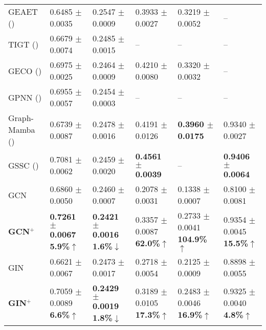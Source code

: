 \begin{table*}[t]
{\begin{tabular}{l|lllll}
        GEAET (\citeyear{liang2024graph}) & 0.6485{\tiny{ $\pm$ 0.0035}} & 0.2547{\tiny{ $\pm$ 0.0009}}&   0.3933{\tiny{ $\pm$ 0.0027}}& 0.3219{\tiny{ $\pm$ 0.0052}} & – \\
        TIGT (\citeyear{choi2024topology}) & 0.6679{\tiny{ $\pm$ 0.0074}} &0.2485{\tiny{ $\pm$ 0.0015}}&  – &  – &  – \\
        GECO (\citeyear{sancak2024scalable})& 0.6975{\tiny{ $\pm$ 0.0025}} &0.2464{\tiny{ $\pm$ 0.0009}} &0.4210{\tiny{ $\pm$ 0.0080}} &0.3320{\tiny{ $\pm$ 0.0032}}& – \\
        GPNN (\citeyear{lin2024understanding})& 0.6955{\tiny{ $\pm$ 0.0057}} &0.2454{\tiny{ $\pm$ 0.0003}} &  – &  – &  –  \\
        Graph-Mamba (\citeyear{wang2024graph}) & 0.6739{\tiny{ $\pm$ 0.0087}} &0.2478{\tiny{ $\pm$ 0.0016}}& 0.4191{\tiny{ $\pm$ 0.0126}} &\textbf{\textcolor{customcyan}{0.3960{\tiny{ $\pm$ 0.0175}}}} &0.9340{\tiny{ $\pm$  0.0027}} \\
        GSSC (\citeyear{huang2024can}) & 0.7081{\tiny{ $\pm$ 0.0062}}& 0.2459{\tiny{ $\pm$ 0.0020}}& \textbf{\textcolor{customcyan}{0.4561{\tiny{ $\pm$ 0.0039}}}} & – &\textbf{\textcolor{tealblue!90}{0.9406{\tiny{ $\pm$ 0.0064}}}} \\
         \midrule %
        GCN & 0.6860{\tiny{ $\pm$ 0.0050}} &0.2460{\tiny{ $\pm$ 0.0007}} &0.2078{\tiny{ $\pm$ 0.0031}} &0.1338{\tiny{ $\pm$ 0.0007}} &   0.8100{\tiny{ $\pm$ 0.0081}} \\
        \rowcolor{gray!20}
       \textbf{GCN$^+$} & \textbf{\textcolor{customcyan}{0.7261{\tiny{ $\pm$ 0.0067}}}} \textbf{5.9\%$\uparrow$}& \textbf{\textcolor{customcyan}{0.2421{\tiny{ $\pm$ 0.0016}}}} \textbf{1.6\%$\downarrow$} & 0.3357{\tiny{ $\pm$ 0.0087}} \textbf{62.0\%$\uparrow$} & 0.2733{\tiny{ $\pm$ 0.0041}} \textbf{104.9\%$\uparrow$} & 0.9354{\tiny{ $\pm$ 0.0045}} \textbf{15.5\%$\uparrow$} \\ 
       \midrule %
        GIN &  0.6621{\tiny{ $\pm$ 0.0067}}& 0.2473{\tiny{ $\pm$ 0.0017}}&  0.2718{\tiny{ $\pm$ 0.0054}}& 0.2125{\tiny{ $\pm$ 0.0009}}&  0.8898{\tiny{ $\pm$ 0.0055}}  \\ 
        \rowcolor{gray!20}
         \textbf{GIN$^+$} & 0.7059{\tiny{ $\pm$ 0.0089}} \textbf{6.6\%$\uparrow$} & \textbf{\textcolor{tealblue!90}{0.2429{\tiny{ $\pm$ 0.0019}}}} \textbf{1.8\%$\downarrow$} & 0.3189{\tiny{ $\pm$ 0.0105}} \textbf{17.3\%$\uparrow$} & 0.2483{\tiny{ $\pm$ 0.0046}} \textbf{16.9\%$\uparrow$} & 0.9325{\tiny{ $\pm$ 0.0040}} \textbf{4.8\%$\uparrow$} \\  

\end{tabular}}
\end{table*}

